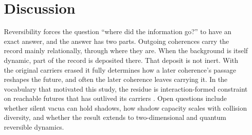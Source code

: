 \section{Discussion}
Reversibility forces the question ``where did the information go?'' to have an exact answer, and
the answer has two parts. Outgoing coherences carry the record mainly relationally, through where
they are. When the background is itself dynamic, part of the record is deposited there. That deposit
is not inert. With the original carriers erased it fully determines how a later coherence's passage
reshapes the future, and often the later coherence leaves carrying it. In the vocabulary that
motivated this study, the residue is interaction-formed constraint on reachable futures that has
outlived its carriers \cite{clark2026icp}. Open questions include whether silent vacua can hold
shadows, how shadow capacity scales with collision diversity, and whether the result extends to
two-dimensional and quantum reversible dynamics.
